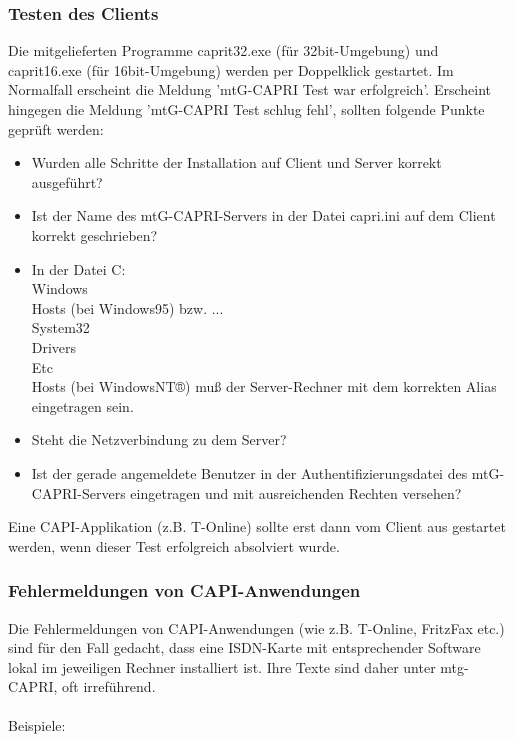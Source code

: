 \subsubsection{Testen des Clients}
    Die mitgelieferten Programme caprit32.exe (für 32bit-Umgebung) und caprit16.exe
    (für 16bit-Umgebung) werden per Doppelklick gestartet.
    Im Normalfall erscheint die Meldung 'mtG-CAPRI Test war erfolgreich'.
    Erscheint hingegen die Meldung 'mtG-CAPRI Test schlug fehl', sollten folgende Punkte geprüft werden:
    \begin{itemize}
        \item Wurden alle Schritte der Installation auf Client und Server korrekt ausgeführt?
        \item Ist der Name des mtG-CAPRI-Servers in der Datei capri.ini auf dem Client korrekt geschrieben?
        \item In der Datei C:\\Windows\\Hosts (bei Windows95) bzw. ...\\System32\\Drivers\\Etc\\Hosts
            (bei WindowsNT®) muß der Server-Rechner mit dem korrekten Alias eingetragen sein.
        \item Steht die Netzverbindung zu dem Server?
        \item Ist der gerade angemeldete Benutzer in der Authentifizierungsdatei des mtG-CAPRI-Servers
            eingetragen und mit ausreichenden Rechten versehen?
    \end{itemize}

    Eine CAPI-Applikation (z.B. T-Online) sollte erst dann vom Client aus gestartet werden, wenn dieser
    Test erfolgreich absolviert wurde.

\subsubsection{Fehlermeldungen von CAPI-Anwendungen}
    Die Fehlermeldungen von CAPI-Anwendungen (wie z.B. T-Online, FritzFax etc.) sind für den Fall gedacht,
    dass eine ISDN-Karte mit entsprechender Software lokal im jeweiligen Rechner installiert ist.
    Ihre Texte sind daher unter mtg-CAPRI, oft irreführend. \\
    \\
    Beispiele: \\

